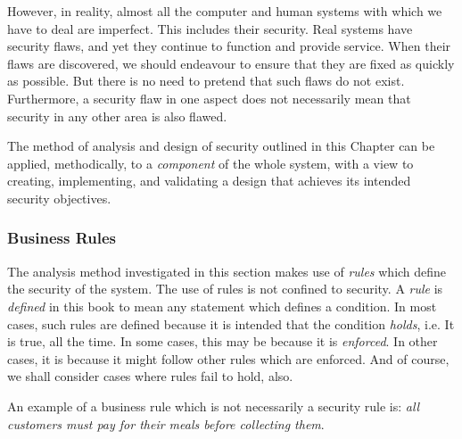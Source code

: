 However, in reality, almost all the computer and human systems with which we have to deal are imperfect. This includes their security. Real systems have security flaws, and yet they continue to function and provide service. When their flaws are discovered, we should endeavour to ensure that they are fixed as quickly as possible. But there is no need to pretend that such flaws do not exist. Furthermore, a security flaw in one aspect does not necessarily mean that security in any other area is also flawed.

The method of analysis and design of security outlined in this Chapter can be applied, methodically, to a {\em component} of the whole system, with a view to creating, implementing, and validating a design that achieves its intended security objectives.

\subsubsection{Business Rules}

The analysis method investigated in this section makes use of {\em rules} which define the security of the system. The use of rules is not confined to security.
A {\em rule} is {\em defined} in this book to mean any statement which defines
a condition. In most cases, such rules are defined because it is intended that the condition {\em holds}, i.e. It is true, all the time. In some cases, this may be because it is {\em enforced}. In other cases, it is because it might follow other rules which are enforced. And of course, we shall consider cases where rules fail to hold, also.

An example of a business rule which is not necessarily a security rule is: {\em all customers must pay for their meals before collecting them}. 


